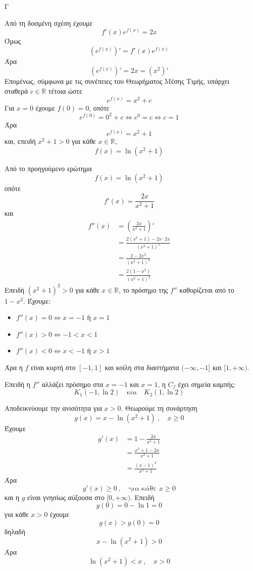 \begin{thema}{Γ}
\begin{erwthma}
\item Από τη δοσμένη σχέση έχουμε
\[
f'(x)e^{f(x)}=2x
\]
Όμως
\[
\left(e^{f(x)}\right)'=f'(x)e^{f(x)}
\]
Άρα
\[
\left(e^{f(x)}\right)'=2x=(x^2)'
\]
Επομένως, σύμφωνα με τις συνέπειες του Θεωρήματος Μέσης Τιμής, υπάρχει σταθερά $c\in\mathbb{R}$ τέτοια ώστε
\[
e^{f(x)}=x^2+c
\]
Για $x=0$ έχουμε $f(0)=0$, οπότε
\[
e^{f(0)}=0^2+c\Leftrightarrow e^0=c\Leftrightarrow c=1
\]
Άρα
\[
e^{f(x)}=x^2+1
\]
και, επειδή $x^2+1>0$ για κάθε $x\in\mathbb{R}$,
\[
f(x)=\ln(x^2+1)
\]

\item Από το προηγούμενο ερώτημα
\[
f(x)=\ln(x^2+1)
\]
οπότε
\[
f'(x)=\frac{2x}{x^2+1}
\]
και
\begin{align*}
f''(x)
&=\left(\frac{2x}{x^2+1}\right)'\\
&=\frac{2(x^2+1)-2x\cdot 2x}{(x^2+1)^2}\\
&=\frac{2-2x^2}{(x^2+1)^2}\\
&=\frac{2(1-x^2)}{(x^2+1)^2}
\end{align*}
Επειδή $(x^2+1)^2>0$ για κάθε $x\in\mathbb{R}$, το πρόσημο της $f''$ καθορίζεται από το $1-x^2$.
Έχουμε:
\begin{itemize}
\item $f''(x)=0\Leftrightarrow x=-1$ ή $x=1$
\item $f''(x)>0\Leftrightarrow -1<x<1$
\item $f''(x)<0\Leftrightarrow x<-1$ ή $x>1$
\end{itemize}
Άρα η $f$ είναι κυρτή στο $[-1,1]$ και κοίλη στα διαστήματα $(-\infty,-1]$ και $[1,+\infty)$.

Επειδή η $f''$ αλλάζει πρόσημο στα $x=-1$ και $x=1$, η $C_f$ έχει σημεία καμπής:
\[
K_1(-1,\ln 2)
\quad \text{και}\quad
K_2(1,\ln 2)
\]

\item Αποδεικνύουμε την ανισότητα για $x>0$.
Θεωρούμε τη συνάρτηση
\[
g(x)=x-\ln(x^2+1)\ ,\quad x\geq 0
\]
Έχουμε
\begin{align*}
g'(x)
&=1-\frac{2x}{x^2+1}\\
&=\frac{x^2+1-2x}{x^2+1}\\
&=\frac{(x-1)^2}{x^2+1}
\end{align*}
Άρα
\[
g'(x)\geq 0\ ,\quad \text{για κάθε }x\geq 0
\]
και η $g$ είναι γνησίως αύξουσα στο $[0,+\infty)$.
Επειδή
\[
g(0)=0-\ln 1=0
\]
για κάθε $x>0$ έχουμε
\[
g(x)>g(0)=0
\]
δηλαδή
\[
x-\ln(x^2+1)>0
\]
Άρα
\[
\ln(x^2+1)<x\ ,\quad x>0
\]


\end{erwthma}
\end{thema}
